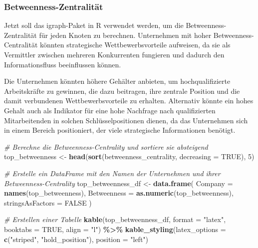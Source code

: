 \documentclass[
]{article}
\newenvironment{Shaded}{\begin{snugshade}}{\end{snugshade}}
\newcommand{\AttributeTok}[1]{\textcolor[rgb]{0.13,0.29,0.53}{#1}}
\newcommand{\CommentTok}[1]{\textcolor[rgb]{0.56,0.35,0.01}{\textit{#1}}}
\newcommand{\ConstantTok}[1]{\textcolor[rgb]{0.56,0.35,0.01}{#1}}
\newcommand{\DecValTok}[1]{\textcolor[rgb]{0.00,0.00,0.81}{#1}}
\newcommand{\FunctionTok}[1]{\textcolor[rgb]{0.13,0.29,0.53}{\textbf{#1}}}
\newcommand{\NormalTok}[1]{#1}
\newcommand{\OtherTok}[1]{\textcolor[rgb]{0.56,0.35,0.01}{#1}}
\newcommand{\SpecialCharTok}[1]{\textcolor[rgb]{0.81,0.36,0.00}{\textbf{#1}}}
\newcommand{\StringTok}[1]{\textcolor[rgb]{0.31,0.60,0.02}{#1}}
\begin{document}
\subsubsection{Betweenness-Zentralität}\label{betweenness-zentralituxe4t}

Jetzt soll das igraph-Paket in R verwendet werden, um die
Betweenness-Zentralität für jeden Knoten zu berechnen. Unternehmen mit
hoher Betweenness-Centralität könnten strategische Wettbewerbsvorteile
aufweisen, da sie als Vermittler zwischen mehreren Konkurrenten
fungieren und dadurch den Informationsfluss beeinflussen können.

Die Unternehmen könnten höhere Gehälter anbieten, um hochqualifizierte
Arbeitskräfte zu gewinnen, die dazu beitragen, ihre zentrale Position
und die damit verbundenen Wettbewerbsvorteile zu erhalten. Alternativ
könnte ein hohes Gehalt auch als Indikator für eine hohe Nachfrage nach
qualifizierten Mitarbeitenden in solchen Schlüsselpositionen dienen, da
das Unternehmen sich in einem Bereich positioniert, der viele
strategische Informationen benötigt.

\begin{Shaded}
\begin{Highlighting}[]
\CommentTok{\# Berechne die Betweenness{-}Centrality und sortiere sie absteigend}
\NormalTok{top\_betweenness }\OtherTok{\textless{}{-}} \FunctionTok{head}\NormalTok{(}\FunctionTok{sort}\NormalTok{(betweenness\_centrality, }\AttributeTok{decreasing =} \ConstantTok{TRUE}\NormalTok{), }\DecValTok{5}\NormalTok{)}

\CommentTok{\# Erstelle ein DataFrame mit den Namen der Unternehmen und ihrer Betweenness{-}Centrality}
\NormalTok{top\_betweenness\_df }\OtherTok{\textless{}{-}} \FunctionTok{data.frame}\NormalTok{(}
  \AttributeTok{Company =} \FunctionTok{names}\NormalTok{(top\_betweenness),}
  \AttributeTok{Betweenness =} \FunctionTok{as.numeric}\NormalTok{(top\_betweenness),}
  \AttributeTok{stringsAsFactors =} \ConstantTok{FALSE}
\NormalTok{)}

\CommentTok{\# Erstellen einer Tabelle}
\FunctionTok{kable}\NormalTok{(top\_betweenness\_df, }\AttributeTok{format =} \StringTok{"latex"}\NormalTok{, }\AttributeTok{booktabs =} \ConstantTok{TRUE}\NormalTok{, }\AttributeTok{align =} \StringTok{"l"}\NormalTok{) }\SpecialCharTok{\%\textgreater{}\%}
\FunctionTok{kable\_styling}\NormalTok{(}\AttributeTok{latex\_options =} \FunctionTok{c}\NormalTok{(}\StringTok{"striped"}\NormalTok{, }\StringTok{"hold\_position"}\NormalTok{), }\AttributeTok{position =} \StringTok{"left"}\NormalTok{)}
\end{Highlighting}
\end{Shaded}
\end{document}
